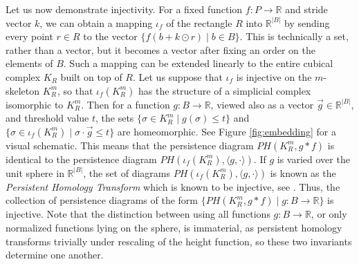 \documentclass[conference]{IEEEtran}
\theoremstyle{definition}
\numberwithin{figure}{section}
\begin{document}
Let us now demonstrate injectivity. For a fixed function $f:P \to \mathbb{R}$ and stride vector $k$, we can obtain a mapping $\iota_{f}$ of the rectangle $R$ into $\mathbb{R}^{|B|}$ by sending every point $r \in R$ to the vector $\{f(b + k \odot r) \mid b \in B\}$. This is technically a set, rather than a vector, but it becomes a vector after fixing an order on the elements of $B$. Such a mapping can be extended linearly to the entire cubical complex $K_{R}$ built on top of $R$. Let us suppose that $\iota_{f}$ is injective on the $m$-skeleton $K_{R}^m$, so that $\iota_{f}(K_{R}^m)$ has the structure of a simplicial complex isomorphic to $K_{R}^m$. Then for a function $g: B \to \mathbb{R}$, viewed also as a vector $\vec{g} \in \mathbb{R}^{|B|}$, and threshold value $t$, the sets $\{\sigma \in K_{R}^{m} \mid g(\sigma) \leq t\}$ and $\{\sigma \in \iota_{f}(K_{R}^m) \mid \sigma \cdot \vec{g} \leq t \}$ are homeomorphic. See Figure \ref{fig:embedding} for a visual schematic. This means that the persistence diagram $PH(K_{R}^m,g \ast f)$ is identical to the persistence diagram $PH(\iota_{f}(K_{R}^m),\langle g, \cdot \rangle)$. If $g$ is varied over the unit sphere in $\mathbb{R}^{|B|}$, the set of diagrams $PH(\iota_{f}(K_{R}^m),\langle g, \cdot \rangle)$ is known as the \emph{Persistent Homology Transform} which is known to be injective, see \cite{turner2014persistent,ghrist2018persistent,curry2018many}. Thus, the collection of persistence diagrams of the form $\{PH(K_{R}^m, g \ast f) \mid g : B \to \mathbb{R}\}$ is injective. Note that the distinction between using all functions $g: B \to \mathbb{R}$, or only normalized functions lying on the sphere, is immaterial, as persistent homology transforms trivially under rescaling of the height function, so these two invariants determine one another.\\ 
\end{document}
